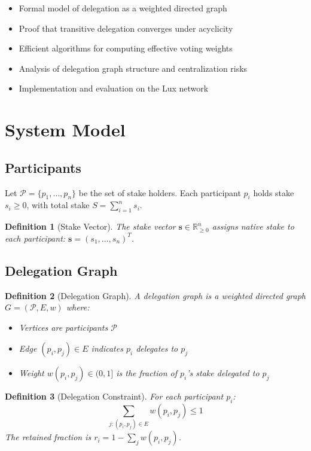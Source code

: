 \documentclass[11pt,a4paper]{article}
\newtheorem{definition}{Definition}
\begin{document}
\begin{itemize}
    \item Formal model of delegation as a weighted directed graph
    \item Proof that transitive delegation converges under acyclicity
    \item Efficient algorithms for computing effective voting weights
    \item Analysis of delegation graph structure and centralization risks
    \item Implementation and evaluation on the Lux network
\end{itemize}

\section{System Model}

\subsection{Participants}

Let $\mathcal{P} = \{p_1, \ldots, p_n\}$ be the set of stake holders. Each participant $p_i$ holds stake $s_i \geq 0$, with total stake $S = \sum_{i=1}^{n} s_i$.

\begin{definition}[Stake Vector]
The stake vector $\mathbf{s} \in \mathbb{R}^n_{\geq 0}$ assigns native stake to each participant: $\mathbf{s} = (s_1, \ldots, s_n)^T$.
\end{definition}

\subsection{Delegation Graph}

\begin{definition}[Delegation Graph]
A delegation graph is a weighted directed graph $G = (\mathcal{P}, E, w)$ where:
\begin{itemize}
    \item Vertices are participants $\mathcal{P}$
    \item Edge $(p_i, p_j) \in E$ indicates $p_i$ delegates to $p_j$
    \item Weight $w(p_i, p_j) \in (0, 1]$ is the fraction of $p_i$'s stake delegated to $p_j$
\end{itemize}
\end{definition}

\begin{definition}[Delegation Constraint]
For each participant $p_i$:
\[
\sum_{j : (p_i, p_j) \in E} w(p_i, p_j) \leq 1
\]
The retained fraction is $r_i = 1 - \sum_{j} w(p_i, p_j)$.
\end{definition}
\end{document}
